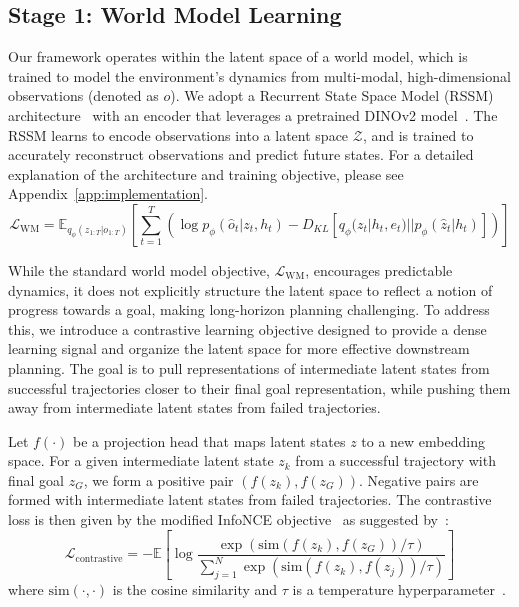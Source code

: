 \documentclass{article} %
\begin{document}
\subsection{Stage 1: World Model Learning}
\label{sec:stage1}
\vspace{-5pt}
Our framework operates within the latent space of a world model, which is trained to model the environment's dynamics from multi-modal, high-dimensional observations (denoted as $o$). We adopt a Recurrent State Space Model (RSSM) architecture~\citep{hafner2023mastering} with an encoder that leverages a pretrained DINOv2 model~\citep{oquab2024dinov}. The RSSM learns to encode observations into a latent space $\mathcal{Z}$, and is trained to accurately reconstruct observations and predict future states. For a detailed explanation of the architecture and training objective, please see Appendix~\ref{app:implementation}.
\begin{equation}
    \mathcal{L}_{\text{WM}} = \mathbb{E}_{q_\phi(z_{1:T}|o_{1:T})} \left[ \sum_{t=1}^T \left( \log p_\phi(\hat{o}_t|z_t, h_t) - D_{KL}[q_\phi(z_t|h_t, e_t) || p_\phi(\hat{z}_t|h_t)] \right) \right]
\end{equation}

While the standard world model objective, $\mathcal{L}_{\text{WM}}$, encourages predictable dynamics, it does not explicitly structure the latent space to reflect a notion of progress towards a goal, making long-horizon planning challenging. To address this, we introduce a contrastive learning objective designed to provide a dense learning signal and organize the latent space for more effective downstream planning. The goal is to pull representations of intermediate latent states from successful trajectories closer to their final goal representation, while pushing them away from intermediate latent states from failed trajectories.

Let $f(\cdot)$ be a projection head that maps latent states $z$ to a new embedding space. For a given intermediate latent state $z_k$ from a successful trajectory with final goal $z_G$, we form a positive pair $(f(z_k), f(z_G))$. Negative pairs are formed with intermediate latent states from failed trajectories. The contrastive loss is then given by the modified InfoNCE objective~\citep{oord2018representation} as suggested by~\citep{schroff2015facenet,sohn2016improved}:
\begin{equation}
    \mathcal{L}_{\text{contrastive}} = -\mathbb{E} \left[ \log \frac{\exp(\text{sim}(f(z_k), f(z_G)) / \tau)}{\sum_{j=1}^{N} \exp(\text{sim}(f(z_k), f(z_{j})) / \tau)} \right]
\end{equation}
where $\text{sim}(\cdot, \cdot)$ is the cosine similarity and $\tau$ is a temperature hyperparameter~\citep{wang2021understanding}.
\end{document}
